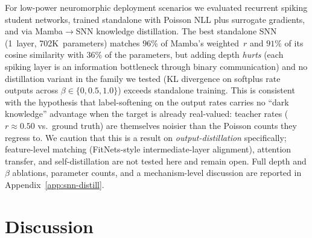 \documentclass{article}
\begin{document}
For low-power neuromorphic deployment scenarios we evaluated recurrent
spiking student networks, trained standalone with Poisson NLL plus
surrogate gradients, and via Mamba$\to$SNN knowledge distillation.
The best standalone SNN (1~layer, 702K~parameters) matches $96\%$ of
Mamba's weighted~$r$ and $91\%$ of its cosine similarity with $36\%$
of the parameters, but adding depth \emph{hurts} (each spiking layer is an
information bottleneck through binary communication) and no
distillation variant in the family we tested (KL divergence on
softplus rate outputs across $\beta \in \{0, 0.5, 1.0\}$) exceeds
standalone training.  This is consistent with the hypothesis that
label-softening on the output rates carries no ``dark knowledge''
advantage when the target is already real-valued: teacher rates
($r \approx 0.50$ vs.~ground truth) are themselves noisier than the
Poisson counts they regress to.  We caution that this is a result on
\emph{output-distillation} specifically; feature-level matching
(FitNets-style intermediate-layer alignment), attention transfer, and
self-distillation are not tested here and remain open.  Full depth
and $\beta$ ablations, parameter counts, and a mechanism-level
discussion are reported in Appendix~\ref{app:snn-distill}.


\section{Discussion}
\label{sec:discussion}
\end{document}
